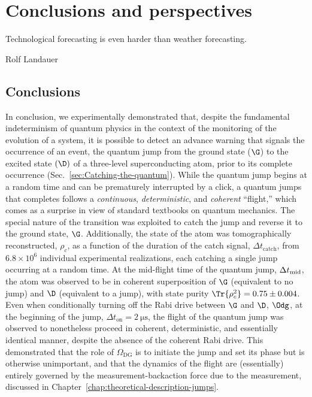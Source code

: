 
\chapter{Conclusions and perspectives\label{chap:Conclusion-and-perspective}}


\singlespacing 
\epigraph{
Technological forecasting is even harder than weather forecasting.}
{Rolf Landauer} 
\doublespacing  \noindent 


\section{Conclusions}

In conclusion, we experimentally demonstrated that, despite the fundamental
indeterminism of quantum physics in the context of the monitoring
of the evolution of a system, it is possible to detect an advance
warning that signals the occurrence of an event, the quantum jump
from the ground state ($\G$) to the excited state $(\D)$ of a three-level
superconducting atom, prior to its complete occurrence (Sec.~\ref{sec:Catching-the-quantum}).
While the quantum jump begins at a random time and can be prematurely
interrupted by a click, a quantum jumps that completes follows a \emph{continuous},
\emph{deterministic}, and \emph{coherent} ``flight,'' which comes
as a surprise in view of standard textbooks on quantum mechanics.
The special nature of the transition was exploited to catch the jump
and reverse it to the ground state, $\G$. Additionally, the state
of the atom was tomographically reconstructed, $\rho_{c}$, as a function
of the duration of the catch signal, $\Delta t_{\mathrm{catch}}$,
from $6.8\times10^{6}$ individual experimental realizations, each
catching a single jump occurring at a random time. At the mid-flight
time of the quantum jump, $\Delta t_{{\rm mid}}$, the atom was observed
to be in coherent superposition of $\G$ (equivalent to no jump) and
$\D$ (equivalent to a jump), with state purity $\Tr{\rho_{c}^{2}}=0.75\pm0.004$.
Even when conditionally turning off the Rabi drive between $\G$ and
$\D$, $\Odg$, at the beginning of the jump, $\Delta t_{\mathrm{on}}=2\ \mathrm{\mu s}$,
the flight of the quantum jump was observed to nonetheless proceed
in coherent, deterministic, and essentially identical manner, despite
the absence of the coherent Rabi drive. This demonstrated  that the
role of $\Omega_{\mathrm{DG}}$ is to initiate the jump and set its
phase but is otherwise unimportant, and that the dynamics of the flight
are (essentially) entirely governed by the measurement-backaction
force due to the measurement, discussed in Chapter~\ref{chap:theoretical-description-jumps}. 

